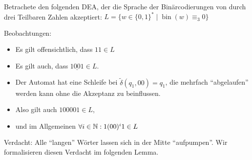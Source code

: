 \begin{Bsp*} Betrachete den folgenden \ac{DEA}, der die Sprache der Binärcodierungen von durch drei Teilbaren Zahlen akzeptiert:
                $L = \{ w\in \{0,1\}^* \mid \operatorname{bin}(w)\equiv_3 0\}$
    \begin{center}
  \end{center}
  Beobachtungen:
  \begin{itemize}
  \item Es gilt offensichtlich, dass $11 \in L$
  \item Es gilt auch, dass $1 \underline{0 0} 1 \in L$.
  \item Der Automat hat eine Schleife bei $\tilde\delta({q_1,00}) = q_1$, die mehrfach "`abgelaufen"' werden kann ohne die Akzeptanz zu beinflussen.
  \item Also gilt auch $100001 \in L$,
  \item und im Allgemeinen $\forall i\in\mathbb{N}: 1(00)^i1 \in L$
  \qedhere
  \end{itemize}
\end{Bsp*}
Verdacht: Alle "`langen"' Wörter lassen sich in der Mitte "`aufpumpen"'.
Wir formalisieren diesen Verdacht im folgenden Lemma.

